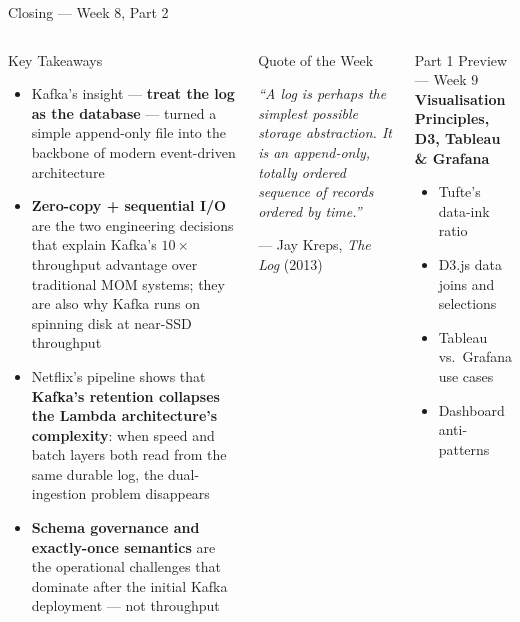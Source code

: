 \documentclass[aspectratio=169,10pt]{beamer}
\begin{document}
\begin{frame}{Closing — Week 8, Part 2}
  \begin{columns}[T]
      \begin{block}{Key Takeaways}
        \begin{itemize}
          \item Kafka's insight — \textbf{treat the log as the database}
                — turned a simple append-only file into the backbone
                of modern event-driven architecture
          \item \textbf{Zero-copy + sequential I/O} are the two
                engineering decisions that explain Kafka's $10\times$
                throughput advantage over traditional MOM systems;
                they are also why Kafka runs on spinning disk at
                near-SSD throughput
          \item Netflix's pipeline shows that \textbf{Kafka's retention
                collapses the Lambda architecture's complexity}: when
                speed and batch layers both read from the same durable
                log, the dual-ingestion problem disappears
          \item \textbf{Schema governance and exactly-once semantics}
                are the operational challenges that dominate after
                the initial Kafka deployment — not throughput
        \end{itemize}
      \end{block}

      \begin{alertblock}{Quote of the Week}
        \begin{center}
        \large\itshape
        ``A log is perhaps the simplest
        possible storage abstraction.
        It is an append-only, totally
        ordered sequence of records
        ordered by time.''
        \end{center}
        \begin{flushright}
        \small --- Jay Kreps, \textit{The Log} (2013)
        \end{flushright}
      \end{alertblock}
      \vspace{6pt}
      \begin{exampleblock}{Part 1 Preview — Week 9}
        \textbf{Visualisation Principles, D3, Tableau \& Grafana}\\[3pt]
        \begin{itemize}\setlength\itemsep{1pt}
          \item Tufte's data-ink ratio
          \item D3.js data joins and selections
          \item Tableau vs.\ Grafana use cases
          \item Dashboard anti-patterns
        \end{itemize}
      \end{exampleblock}
  \end{columns}
\end{frame}

\end{document}
